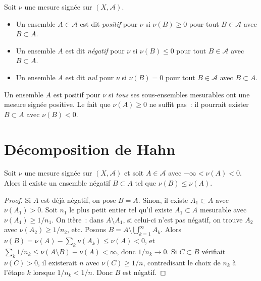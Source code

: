 \begin{definition}
Soit $\nu$ une mesure sign\'ee sur $(X, \mathcal{A})$.
\begin{itemize}
    \item Un ensemble $A \in \mathcal{A}$ est dit \emph{positif}
    pour $\nu$ si $\nu(B) \geq 0$ pour tout $B \in \mathcal{A}$ avec $B \subset A$.
    \item Un ensemble $A$ est dit \emph{n\'egatif}
    pour $\nu$ si $\nu(B) \leq 0$ pour tout $B \in \mathcal{A}$ avec $B \subset A$.
    \item Un ensemble $A$ est dit \emph{nul} pour $\nu$
    si $\nu(B) = 0$ pour tout $B \in \mathcal{A}$ avec $B \subset A$.
\end{itemize}
\end{definition}

\begin{attention}[title=\textbf{Positif pour $\nu$ $\neq$ $\nu(A) \geq 0$}]
Un ensemble $A$ est positif pour $\nu$ si \emph{tous} ses sous-ensembles mesurables
ont une mesure sign\'ee positive. Le fait que $\nu(A) \geq 0$ ne suffit pas~: il
pourrait exister $B \subset A$ avec $\nu(B) < 0$.
\end{attention}

\section{D\'ecomposition de Hahn}

\begin{lemme}
\label{lem:hahn_negatif}
Soit $\nu$ une mesure sign\'ee sur $(X, \mathcal{A})$ et soit $A \in \mathcal{A}$
avec $-\infty < \nu(A) < 0$. Alors il existe un ensemble n\'egatif $B \subset A$
tel que $\nu(B) \leq \nu(A)$.
\end{lemme}

\begin{proof}
Si $A$ est d\'ej\`a n\'egatif, on pose $B = A$. Sinon, il existe $A_1 \subset A$
avec $\nu(A_1) > 0$. Soit $n_1$ le plus petit entier tel qu'il existe
$A_1 \subset A$ mesurable avec $\nu(A_1) \geq 1/n_1$. On it\`ere~: dans
$A \setminus A_1$, si celui-ci n'est pas n\'egatif, on trouve $A_2$ avec
$\nu(A_2) \geq 1/n_2$, etc. Posons $B = A \setminus \bigcup_{k=1}^{\infty} A_k$.
Alors $\nu(B) = \nu(A) - \sum_{k} \nu(A_k) \leq \nu(A) < 0$, et
$\sum_k 1/n_k \leq \nu(A \setminus B) - \nu(A) < \infty$, donc $1/n_k \to 0$.
Si $C \subset B$ v\'erifiait $\nu(C) > 0$, il existerait $n$ avec $\nu(C) \geq 1/n$,
contredisant le choix de $n_k$ \`a l'\'etape $k$ lorsque $1/n_k < 1/n$. Donc $B$ est
n\'egatif.
\end{proof}


